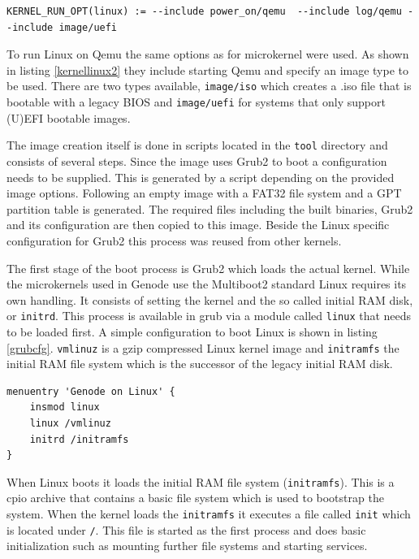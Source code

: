 \documentclass[
a4paper,
11pt,
twoside
]{report}
\begin{document}
		\begin{lstlisting}[basicstyle=\ttfamily\footnotesize]
KERNEL_RUN_OPT(linux) := --include power_on/qemu  --include log/qemu --include image/uefi
		\end{lstlisting}
		
		To run Linux on Qemu the same options as for microkernel were used.
		As shown in listing \ref{kernellinux2} they include starting Qemu and specify an image type to be used.
		There are two types available, \texttt{image/iso} which creates a .iso file that is bootable with a legacy BIOS and \texttt{image/uefi} for systems that only support (U)EFI bootable images.
		
		The image creation itself is done in scripts located in the \texttt{tool} directory and consists of several steps.
		Since the image uses Grub2 to boot a configuration needs to be supplied.
		This is generated by a script depending on the provided image options.
		Following an empty image with a FAT32 file system and a GPT partition table is generated.
		The required files including the built binaries, Grub2 and its configuration are then copied to this image.
		Beside the Linux specific configuration for Grub2 this process was reused from other kernels.
		
		
		The first stage of the boot process is Grub2 which loads the actual kernel.
		While the microkernels used in Genode use the Multiboot2 standard Linux requires its own handling.
		It consists of setting the kernel and the so called initial RAM disk, or \texttt{initrd}.
		This process is available in grub via a module called \texttt{linux} that needs to be loaded first.
		A simple configuration to boot Linux is shown in listing \ref{grubcfg}.
		\texttt{vmlinuz} is a gzip compressed Linux kernel image and \texttt{initramfs} the initial RAM file system which is the successor of the legacy initial RAM disk.
		
		\begin{lstlisting}[basicstyle=\ttfamily\footnotesize]
menuentry 'Genode on Linux' {
	insmod linux
	linux /vmlinuz
	initrd /initramfs
}
		\end{lstlisting}
		
		When Linux boots it loads the initial RAM file system (\texttt{initramfs}).
		This is a cpio archive that contains a basic file system which is used to bootstrap the system.
		When the kernel loads the \texttt{initramfs} it executes a file called \texttt{init} which is located under \texttt{/}.
		This file is started as the first process and does basic initialization such as mounting further file systems and starting services.
		
\end{document}
